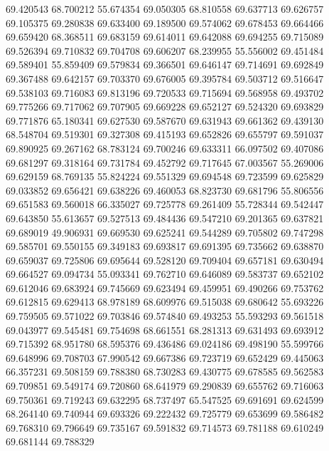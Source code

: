 69.420543
68.700212
55.674354
69.050305
68.810558
69.637713
69.626757
69.105375
69.280838
69.633400
69.189500
69.574062
69.678453
69.664466
69.659420
68.368511
69.683159
69.614011
69.642088
69.694255
69.715089
69.526394
69.710832
69.704708
69.606207
68.239955
55.556002
69.451484
69.589401
55.859409
69.579834
69.366501
69.646147
69.714691
69.692849
69.367488
69.642157
69.703370
69.676005
69.395784
69.503712
69.516647
69.538103
69.716083
69.813196
69.720533
69.715694
69.568958
69.493702
69.775266
69.717062
69.707905
69.669228
69.652127
69.524320
69.693829
69.771876
65.180341
69.627530
69.587670
69.631943
69.661362
69.439130
68.548704
69.519301
69.327308
69.415193
69.652826
69.655797
69.591037
69.890925
69.267162
68.783124
69.700246
69.633311
66.097502
69.407086
69.681297
69.318164
69.731784
69.452792
69.717645
67.003567
55.269006
69.629159
68.769135
55.824224
69.551329
69.694548
69.723599
69.625829
69.033852
69.656421
69.638226
69.460053
68.823730
69.681796
55.806556
69.651583
69.560018
66.335027
69.725778
69.261409
55.728344
69.542447
69.643850
55.613657
69.527513
69.484436
69.547210
69.201365
69.637821
69.689019
49.906931
69.669530
69.625241
69.544289
69.705802
69.747298
69.585701
69.550155
69.349183
69.693817
69.691395
69.735662
69.638870
69.659037
69.725806
69.695644
69.528120
69.709404
69.657181
69.630494
69.664527
69.094734
55.093341
69.762710
69.646089
69.583737
69.652102
69.612046
69.683924
69.745669
69.623494
69.459951
69.490266
69.753762
69.612815
69.629413
68.978189
68.609976
69.515038
69.680642
55.693226
69.759505
69.571022
69.703846
69.574840
69.493253
55.593293
69.561518
69.043977
69.545481
69.754698
68.661551
68.281313
69.631493
69.693912
69.715392
68.951780
68.595376
69.436486
69.024186
69.498190
55.599766
69.648996
69.708703
67.990542
69.667386
69.723719
69.652429
69.445063
66.357231
69.508159
69.788380
68.730283
69.430775
69.678585
69.562583
69.709851
69.549174
69.720860
68.641979
69.290839
69.655762
69.716063
69.750361
69.719243
69.632295
68.737497
65.547525
69.691691
69.624599
68.264140
69.740944
69.693326
69.222432
69.725779
69.653699
69.586482
69.768310
69.796649
69.735167
69.591832
69.714573
69.781188
69.610249
69.681144
69.788329
